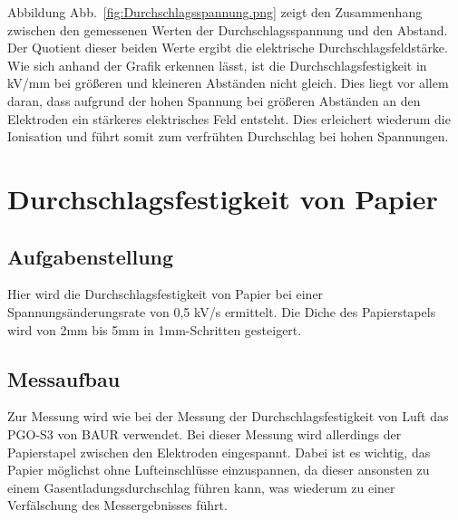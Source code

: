 \documentclass[a4paper,twoside,12pt,DIV=13,BCOR=5mm,numbers=noenddot,cleardoublepage=empty]{scrbook}
\begin{document}
		Abbildung Abb.~\ref{fig:Durchschlagsspannung.png} zeigt den Zusammenhang zwischen den gemessenen Werten der Durchschlagsspannung und den Abstand. 
		Der Quotient dieser beiden Werte ergibt die elektrische Durchschlagsfeldst\"arke.
		\\
		Wie sich anhand der Grafik erkennen l\"asst, ist die Durchschlagsfestigkeit in kV/mm bei gr\"o\ss{}eren und kleineren Abst\"anden nicht gleich. 
		Dies liegt vor allem daran, dass  aufgrund der hohen Spannung bei gr\"o\ss{}eren Abst\"anden an den Elektroden ein st\"arkeres elektrisches Feld entsteht. 
		Dies erleichert wiederum die Ionisation und f\"uhrt somit zum verfr\"uhten Durchschlag bei hohen Spannungen.
	\section{Durchschlagsfestigkeit von Papier}
	
		\subsection{Aufgabenstellung}
		Hier wird die Durchschlagsfestigkeit von Papier bei einer Spannungs\"anderungsrate von 0,5 kV/s ermittelt. 
		Die Diche des Papierstapels wird von 2mm bis 5mm in 1mm-Schritten gesteigert.
		\subsection{Messaufbau}
		Zur Messung wird wie bei der Messung der Durchschlagsfestigkeit von Luft das PGO-S3 von BAUR verwendet. 
		Bei dieser Messung wird allerdings der Papierstapel zwischen den Elektroden eingespannt.
		Dabei ist es wichtig, das Papier m\"oglichst ohne Lufteinschl\"usse einzuspannen, da dieser ansonsten zu einem Gasentladungsdurchschlag f\"uhren kann, was wiederum zu einer Verf\"alschung des Messergebnisses f\"uhrt.
\end{document}
